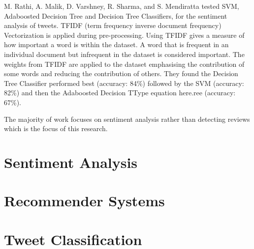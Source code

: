 M. Rathi, A. Malik, D. Varshney, R. Sharma, and S. Mendiratta \cite{Raithi2018} tested SVM, Adaboosted Decision Tree and Decision Tree Classifiers, for the sentiment analysis of tweets. TFIDF (term frequency inverse document frequency) Vectorization is applied during pre-processing. Using TFIDF gives a measure of how important a word is within the dataset. A word that is frequent in an individual document but infrequent in the dataset is considered important. The weights from TFIDF are applied to the dataset emphasising the contribution of some words and reducing the contribution of others. They found the Decision Tree Classifier performed best  (accuracy: 84\%) followed by the SVM (accuracy: 82\%) and then the Adaboosted Decision TType equation here.ree (accuracy: 67\%). 

The majority of work focuses on sentiment analysis rather than detecting reviews which is the focus of this research.

\section{Sentiment Analysis}
\section{Recommender Systems}
\section{Tweet Classification}